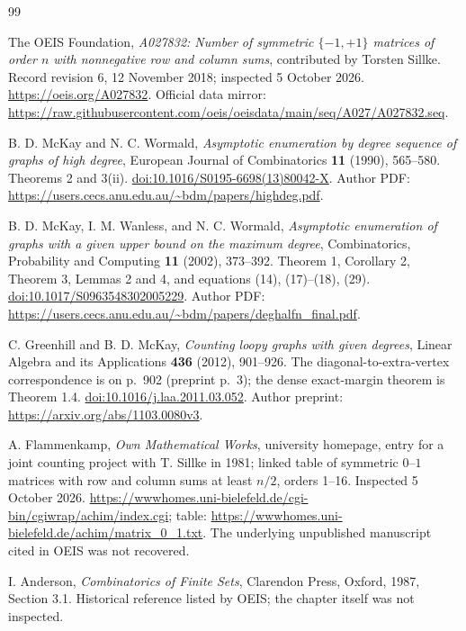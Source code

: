 \begin{thebibliography}{99}
The OEIS Foundation, \emph{A027832: Number of symmetric $\{-1,+1\}$ matrices of order $n$ with nonnegative row and column sums}, contributed by Torsten Sillke. Record revision 6, 12 November 2018; inspected 5 October 2026. \url{https://oeis.org/A027832}. Official data mirror: \url{https://raw.githubusercontent.com/oeis/oeisdata/main/seq/A027/A027832.seq}.

B. D. McKay and N. C. Wormald, \emph{Asymptotic enumeration by degree sequence of graphs of high degree}, European Journal of Combinatorics \textbf{11} (1990), 565--580. Theorems 2 and 3(ii). \href{https://doi.org/10.1016/S0195-6698(13)80042-X}{doi:10.1016/S0195-6698(13)80042-X}. Author PDF: \url{https://users.cecs.anu.edu.au/~bdm/papers/highdeg.pdf}.

B. D. McKay, I. M. Wanless, and N. C. Wormald, \emph{Asymptotic enumeration of graphs with a given upper bound on the maximum degree}, Combinatorics, Probability and Computing \textbf{11} (2002), 373--392. Theorem 1, Corollary 2, Theorem 3, Lemmas 2 and 4, and equations (14), (17)--(18), (29). \href{https://doi.org/10.1017/S0963548302005229}{doi:10.1017/S0963548302005229}. Author PDF: \url{https://users.cecs.anu.edu.au/~bdm/papers/deghalfn_final.pdf}.

C. Greenhill and B. D. McKay, \emph{Counting loopy graphs with given degrees}, Linear Algebra and its Applications \textbf{436} (2012), 901--926. The diagonal-to-extra-vertex correspondence is on p.~902 (preprint p.~3); the dense exact-margin theorem is Theorem 1.4. \href{https://doi.org/10.1016/j.laa.2011.03.052}{doi:10.1016/j.laa.2011.03.052}. Author preprint: \url{https://arxiv.org/abs/1103.0080v3}.

A. Flammenkamp, \emph{Own Mathematical Works}, university homepage, entry for a joint counting project with T. Sillke in 1981; linked table of symmetric $0$--$1$ matrices with row and column sums at least $n/2$, orders 1--16. Inspected 5 October 2026. \url{https://wwwhomes.uni-bielefeld.de/cgi-bin/cgiwrap/achim/index.cgi}; table: \url{https://wwwhomes.uni-bielefeld.de/achim/matrix_0_1.txt}. The underlying unpublished manuscript cited in OEIS was not recovered.

I. Anderson, \emph{Combinatorics of Finite Sets}, Clarendon Press, Oxford, 1987, Section 3.1. Historical reference listed by OEIS; the chapter itself was not inspected.


\end{thebibliography}
